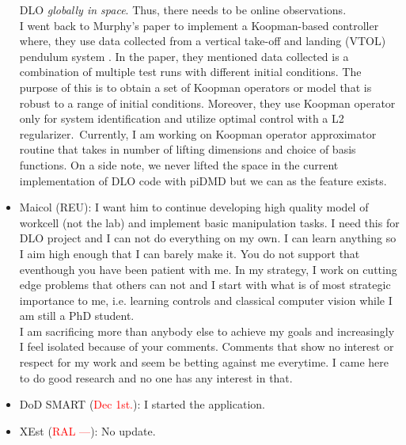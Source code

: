\documentclass[11pt]{article}
\begin{document}
\begin{itemize}
    DLO \emph{globally in space}. Thus, there needs to be online observations.\\
    I went back to Murphy's paper to implement a Koopman-based controller
    where, they use data collected from a
    vertical take-off and landing (VTOL) pendulum system \cite{abraham2017model}.
    In the paper, they mentioned data collected is a combination of multiple
    test runs with different initial conditions. The purpose of this is to
    obtain a set of Koopman operators or model that is robust to a range of
    initial conditions. Moreover, they use Koopman operator only for system
    identification and utilize optimal control with a L2 regularizer.\
    Currently, I am working on Koopman operator approximator routine that
    takes in number of lifting dimensions and choice of basis functions.
    On a side note, we never lifted the space in the current implementation of
    DLO code with piDMD but we can as the feature exists.\\
    \item Maicol (REU): I want him to continue developing high quality model of
    workcell (not the lab) and implement basic manipulation tasks. I need this
    for DLO project and I can not do everything on my own. I can learn anything
    so I aim high enough that I can barely make it. You do not support that
    eventhough you have been patient with me.
    In my strategy, I work on
    cutting edge problems that others can not and I start with what is of most
    strategic importance to me, i.e. learning controls and classical computer
    vision while I am still a PhD student.\\
    I am sacrificing more than anybody else to achieve my goals and
    increasingly I feel isolated because of your comments. Comments that show
    no interest or respect for my work and seem be betting against me everytime.
    I came here to do good research and no one has any interest in that.\\
    \item DoD SMART (\textcolor{red}{Dec 1st.}): I started the application.\\
    \item XEst (\textcolor{red}{RAL ---}): No update.\\
  \end{itemize}
\newpage

\newpage


\end{document}

